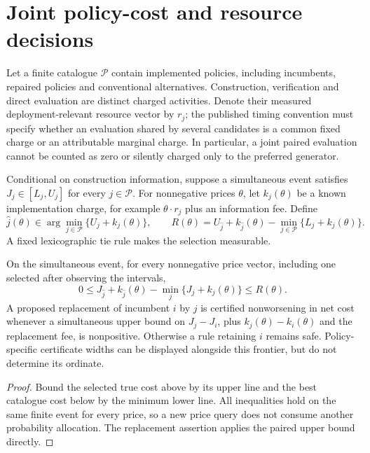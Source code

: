 \section{Joint policy-cost and resource decisions}\label{sec:joint50}
Let a finite catalogue $\mathcal P$ contain implemented policies, including incumbents, repaired policies and conventional alternatives. Construction, verification and direct evaluation are distinct charged activities. Denote their measured deployment-relevant resource vector by $r_j$; the published timing convention must specify whether an evaluation shared by several candidates is a common fixed charge or an attributable marginal charge. In particular, a joint paired evaluation cannot be counted as zero or silently charged only to the preferred generator.

Conditional on construction information, suppose a simultaneous event satisfies
$J_j\in[L_j,U_j]$ for every $j\in\mathcal P$. For nonnegative prices $\theta$, let $k_j(\theta)$ be a known implementation charge, for example $\theta\cdot r_j$ plus an information fee. Define
\begin{equation}\label{eq:jointselector50}
 \widehat j(\theta)\in\arg\min_{j\in\mathcal P}
   \{U_j+k_j(\theta)\},\qquad
 R(\theta)=U_{\widehat j}+k_{\widehat j}(\theta)
            -\min_{j\in\mathcal P}\{L_j+k_j(\theta)\}.
\end{equation}
A fixed lexicographic tie rule makes the selection measurable.
\begin{proposition}\label{prop:joint50}
On the simultaneous event, for every nonnegative price vector, including one selected after observing the intervals,
\[
 0\le J_{\widehat j}+k_{\widehat j}(\theta)
       -\min_j\{J_j+k_j(\theta)\}\le R(\theta).
\]
A proposed replacement of incumbent $i$ by $j$ is certified nonworsening in net cost whenever a simultaneous upper bound on $J_j-J_i$, plus $k_j(\theta)-k_i(\theta)$ and the replacement fee, is nonpositive. Otherwise a rule retaining $i$ remains safe. Policy-specific certificate widths can be displayed alongside this frontier, but do not determine its ordinate.
\end{proposition}
\begin{proof}
Bound the selected true cost above by its upper line and the best catalogue cost below by the minimum lower line. All inequalities hold on the same finite event for every price, so a new price query does not consume another probability allocation. The replacement assertion applies the paired upper bound directly.\end{proof}

